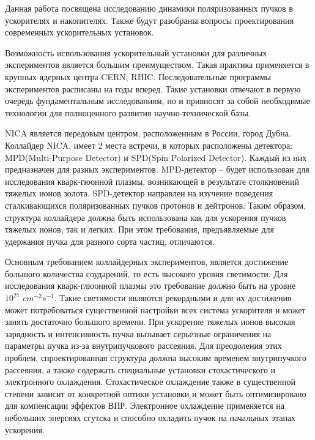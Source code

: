\par Данная работа посвящена исследованию динамики поляризованных пучков в ускорителях и накопителях. Также будут разобраны вопросы проектирования современных ускорительных установок.

\par Возможность использования ускорительный установки для различных экспериментов является большим преимуществом. Такая практика применяется в крупных ядерных центра CERN, RHIC. Последовательные программы экспериментов расписаны на годы вперед. Такие установки отвечают в первую очередь фундаментальным исследованиям, но и привносят за собой необходимые технологии для полноценного развития научно-технической базы.

\par NICA является передовым центром, расположенным в России, город Дубна. Коллайдер NICA, имеет 2 места встречи, в которых расположены детектора: MPD(Multi-Purpose Detector) и SPD(Spin Polarized Detector). Каждый из них предназначен для разных экспериментов. MPD-детектор – будет использован для исследования кварк-гюонной плазмы, возникающей в результате столкновений тяжелых ионов золота. SPD-детектор направлен на изучение поведения сталкивающихся поляризованных пучков протонов и дейтронов. Таким образом, структура коллайдера должна быть использована как для ускорения пучков тяжелых ионов, так и легких. При этом требования, предъявляемые для удержания пучка для разного сорта частиц, отличаются. 

\par Основным требованием коллайдерных экспериментов, является достижение большого количества соударений, то есть высокого уровня светимости. Для исследования кварк-глюонной плазмы это требование должно быть на уровне $10^{27}$ $cm^{-2}s^{-1}$. Такие светимости являются рекордными и для их достижения может потребоваться существенной настройки всех система ускорителя и может занять достаточно большого времени. При ускорение тяжелых ионов высокая зарядность и интенсивность пучка вызывает серьезные ограничения на параметры пучка из-за внутрипучкового рассеяния. Для преодоления этих проблем, спроектированная структура должна высоким временем внутрипучкого рассеяния, а также содержать специальные установки стохастического и электронного охлаждения. Стохастическое охлаждение также в существенной степени зависит от конкретной оптики установки и может быть оптимизировано для компенсации эффектов ВПР. Электронное охлаждение применяется на небольших энергиях сгутска и способно охладить пучок на начальных этапах ускорения.

